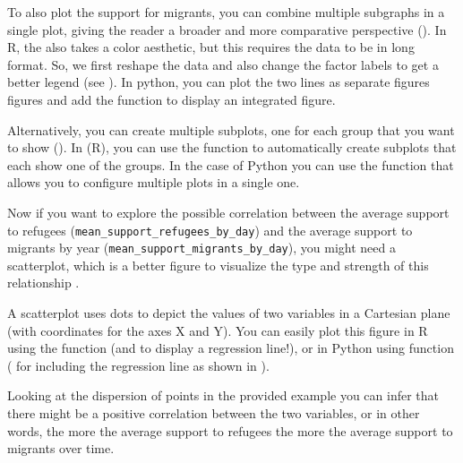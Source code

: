 To also plot the support for migrants, you can combine multiple subgraphs in a single plot,
giving the reader a broader and more comparative perspective ().
In R, the  also takes a color aesthetic, but this requires the data to be in long format.
So, we first reshape the data and also change the factor labels to get a better legend (see ).
In python, you can plot the two lines as separate figures figures and add the  function  to display an integrated figure.


Alternatively, you can create multiple subplots, one for each group that you want to show ().
In  (R), you can use the  function to automatically create subplots that each show one of the groups. In the case of Python you can use the  function  that allows you to configure multiple plots in a single one.


Now if you want to explore the possible correlation between the average support to refugees (\texttt{mean\_support\_refugees\_by\_day}) and the average support to migrants by year (\texttt{mean\_support\_migrants\_by\_day}), you might need a scatterplot, which is a better figure to visualize the type and strength of this relationship . 


A scatterplot uses dots to depict the values of two variables in a Cartesian plane (with coordinates for the axes X and Y). You can easily plot this figure in R using the  function  (and  to display a regression line!), or in Python using  function  ( for including the regression line as shown in ). 


Looking at the dispersion of points in the provided example you can infer that there might be a positive correlation between the two variables, or in other words, the more the average support to refugees the more the average support to migrants over time.

